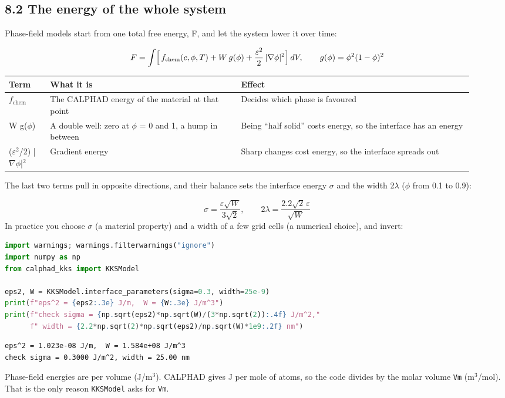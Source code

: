 \documentclass[12pt,a4paper]{article}
\begin{document}
\subsection*{8.2 The energy of the whole system}
Phase-field models start from one total free energy, F, and let the system lower it over time:

\begin{equation*}
F = \int \Bigl[\, f_{\mathrm{chem}}(c,\phi,T) + W\,g(\phi) + \frac{\varepsilon^2}{2}\,\lvert\nabla\phi\rvert^2 \Bigr]\, dV,
\qquad g(\phi) = \phi^2(1-\phi)^2
\end{equation*}
\begingroup\small
\begin{longtable}{>{\raggedright\arraybackslash}p{0.085\linewidth}>{\raggedright\arraybackslash}p{0.379\linewidth}>{\raggedright\arraybackslash}p{0.457\linewidth}}
\toprule
\textbf{Term} & \textbf{What it is} & \textbf{Effect} \\
\midrule
\endhead
\(f_{\mathrm{chem}}\) & The CALPHAD energy of the material at that point & Decides which phase is favoured \\
W g(\(\phi\)) & A double well: zero at \(\phi\) = 0 and 1, a hump in between & Being ``half solid'' costs energy, so the interface has an energy \\
(\(\varepsilon ^{2}\)/2) |\(\nabla \phi\)|\(^{2}\) & Gradient energy & Sharp changes cost energy, so the interface spreads out \\
\bottomrule
\end{longtable}
\endgroup
The last two terms pull in opposite directions, and their balance sets the interface energy \(\sigma\) and the width 2\(\lambda\) (\(\phi\) from 0.1 to 0.9):

\begin{equation*}
\sigma = \frac{\varepsilon\sqrt{W}}{3\sqrt{2}}, \qquad 2\lambda = \frac{2.2\sqrt{2}\,\varepsilon}{\sqrt{W}}
\end{equation*}
In practice you choose \(\sigma\) (a material property) and a width of a few grid cells (a numerical choice), and invert:

\begin{lstlisting}[basicstyle={\footnotesize\ttfamily},language=Python]
import warnings; warnings.filterwarnings("ignore")
import numpy as np
from calphad_kks import KKSModel

eps2, W = KKSModel.interface_parameters(sigma=0.3, width=25e-9)
print(f"eps^2 = {eps2:.3e} J/m,  W = {W:.3e} J/m^3")
print(f"check sigma = {np.sqrt(eps2)*np.sqrt(W)/(3*np.sqrt(2)):.4f} J/m^2,"
      f" width = {2.2*np.sqrt(2)*np.sqrt(eps2)/np.sqrt(W)*1e9:.2f} nm")
\end{lstlisting}
\begin{lstlisting}[basicstyle={\footnotesize\ttfamily}]
eps^2 = 1.023e-08 J/m,  W = 1.584e+08 J/m^3
check sigma = 0.3000 J/m^2, width = 25.00 nm
\end{lstlisting}
Phase-field energies are per volume (J/m\(^{3}\)). CALPHAD gives J per mole of atoms, so the code divides by the molar volume \texttt{Vm} (m\(^{3}\)/mol). That is the only reason \texttt{KKSModel} asks for \texttt{Vm}.
\end{document}
